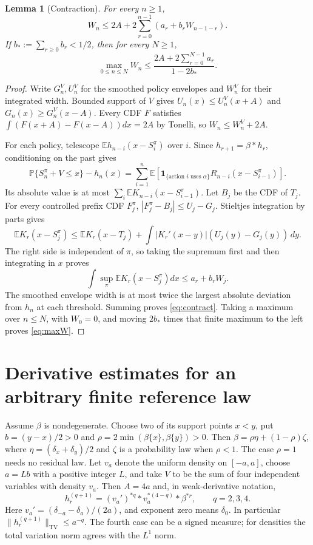 \documentclass[11pt,a4paper]{article}
\newtheorem{lemma}[theorem]{Lemma}
\numberwithin{equation}{section}
\newcommand{\E}{\mathbb E}
\newcommand{\Prb}{\mathbb P}
\newcommand{\TV}{\mathrm{TV}}
\begin{document}
\begin{lemma}[Contraction]\label{lem:contraction}
For every $n\ge1$,
\begin{equation}\label{eq:contract}
W_n\le2A+2\sum_{r=0}^{n-1}(a_r+b_rW_{n-1-r}).
\end{equation}
If $b_*:=\sum_{r\ge0}b_r<1/2$, then for every $N\ge1$,
\begin{equation}\label{eq:maxW}
\max_{0\le n\le N}W_n
\le\frac{2A+2\sum_{r=0}^{N-1}a_r}{1-2b_*}.
\end{equation}
\end{lemma}
\begin{proof}
Write $G_n^V,U_n^V$ for the smoothed policy envelopes and $W_n^V$ for
their integrated width. Bounded support of $V$ gives
$U_n(x)\le U_n^V(x+A)$ and $G_n(x)\ge G_n^V(x-A)$.
Every CDF $F$ satisfies $\int(F(x+A)-F(x-A))dx=2A$ by Tonelli, so
$W_n\le W_n^V+2A$.

For each policy, telescope $\E h_{n-i}(x-S_i^\pi)$ over $i$.
Since $h_{r+1}=\beta*h_r$, conditioning on the past gives
\[
\Prb\{S_n^\pi+V\le x\}-h_n(x)
=\sum_{i=1}^n\E\left[
\mathbf1_{\{\text{action }i\text{ uses }\alpha\}}
R_{n-i}(x-S_{i-1}^\pi)\right].
\]
Its absolute value is at most
$\sum_i\E K_{n-i}(x-S_{i-1}^\pi)$.
Let $B_j$ be the CDF of $T_j$. For every controlled prefix CDF $F_j^\pi$,
$|F_j^\pi-B_j|\le U_j-G_j$. Stieltjes integration by parts gives
\[
\E K_r(x-S_j^\pi)\le\E K_r(x-T_j)
+\int|K_r'(x-y)|(U_j(y)-G_j(y))\,dy.
\]
The right side is independent of $\pi$, so taking the supremum first
and then integrating in $x$ proves
\[
\int\sup_\pi\E K_r(x-S_j^\pi)dx\le a_r+b_rW_j.
\]
The smoothed envelope width is at most twice the largest absolute
deviation from $h_n$ at each threshold. Summing proves
\eqref{eq:contract}. Taking a maximum over $n\le N$, with $W_0=0$,
and moving $2b_*$ times that finite maximum to the left proves
\eqref{eq:maxW}.
\end{proof}

\section{Derivative estimates for an arbitrary finite reference law}
Assume $\beta$ is nondegenerate. Choose two of its support points
$x<y$, put $b=(y-x)/2>0$ and
$\rho=2\min(\beta\{x\},\beta\{y\})>0$.
Then $\beta=\rho\eta+(1-\rho)\zeta$, where
$\eta=(\delta_x+\delta_y)/2$ and $\zeta$ is a probability law when
$\rho<1$. The case $\rho=1$ needs no residual law.
Let $v_a$ denote the uniform density on $[-a,a]$, choose
$a=Lb$ with a positive integer $L$, and take $V$ to be the sum of
four independent variables with density $v_a$. Then $A=4a$ and, in
weak-derivative notation,
\begin{equation}\label{eq:derivative}
h_r^{(q+1)}=(v_a')^{*q}*v_a^{*(4-q)}*\beta^{*r},
\qquad q=2,3,4.
\end{equation}
Here $v_a'=(\delta_{-a}-\delta_a)/(2a)$, and exponent zero means
$\delta_0$. In particular $\|h_r^{(q+1)}\|_{\TV}\le a^{-q}$.
The fourth case can be a signed measure; for densities the total
variation norm agrees with the $L^1$ norm.
\end{document}
